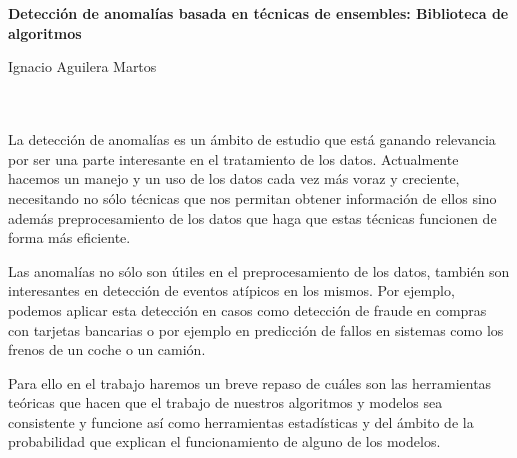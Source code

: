 \chapter*{}






\cleardoublepage
\thispagestyle{empty}

\begin{center}
{\large\bfseries Detección de anomalías basada en técnicas de ensembles: Biblioteca de algoritmos}\\
\end{center}
\begin{center}
Ignacio Aguilera Martos\\
\end{center}

\\

\vspace{0.7cm}
\\

La detección de anomalías es un ámbito de estudio que está ganando relevancia por ser una parte interesante en el tratamiento de los datos. Actualmente hacemos un manejo y un uso de los datos cada vez más voraz y creciente, necesitando no sólo técnicas que nos permitan obtener información de ellos sino además preprocesamiento de los datos que haga que estas técnicas funcionen de forma más eficiente. 

Las anomalías no sólo son útiles en el preprocesamiento de los datos, también son interesantes en detección de eventos atípicos en los mismos. Por ejemplo, podemos aplicar esta detección en casos como detección de fraude en compras con tarjetas bancarias o por ejemplo en predicción de fallos en sistemas como los frenos de un coche o un camión.

Para ello en el trabajo haremos un breve repaso de cuáles son las herramientas teóricas que hacen que el trabajo de nuestros algoritmos y modelos sea consistente y funcione así como herramientas estadísticas y del ámbito de la probabilidad que explican el funcionamiento de alguno de los modelos. 

